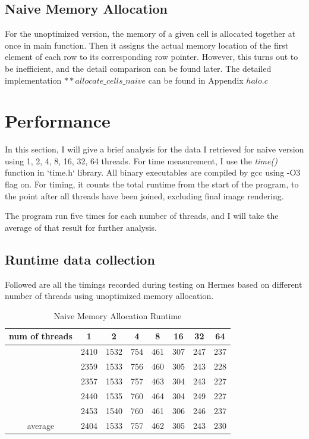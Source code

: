 \documentclass{cs4444}
\begin{document}
	\subsection{Naive Memory Allocation}
		
		For the unoptimized version, the memory of a given cell is allocated together at once in main function. Then it assigns the actual memory location of the first element of each row to its corresponding row pointer. However, this turns out to be inefficient, and the detail comparison can be found later. The detailed implementation $**allocate\_cells\_naive$ can be found in Appendix $halo.c$ 
				 
\section{Performance}
	In this section, I will give a brief analysis for the data I retrieved for naive version using 1, 2, 4, 8, 16, 32, 64 threads. For time measurement, I use the \textit{time()} function in `time.h` library. All binary executables are compiled by gcc using -O3 flag on. For timing, it counts the total runtime from the start of the program, to the point after all threads have been joined, excluding final image rendering.
	 	
	 	The program run five times for each number of threads, and I will take the average of that result for further analysis.

\subsection{Runtime data collection}
	Followed are all the timings recorded during testing on Hermes based on different number of threads using unoptimized memory allocation.
	
\begin{table}[ht]
\caption {Naive Memory Allocation Runtime}
\centering
\begin{tabular}{c c c c c c c c}
\hline\hline
num of threads & 1 & 2 & 4 & 8 & 16 & 32 & 64 \\
\hline
 & 2410 & 1532 & 754 & 461 & 307 & 247 & 237 \\
 & 2359 & 1533 & 756 & 460 & 305 & 243 & 228 \\
 & 2357 & 1533 & 757 & 463 & 304 & 243 & 227 \\
 & 2440 & 1535 & 760 & 464 & 304 & 249 & 227 \\
 & 2453 & 1540 & 760 & 461 & 306 & 246 & 237 \\
\hline
average & 2404 & 1533 & 757 & 462 & 305 & 243 & 230 \\
\end{tabular}
\centering
\end{table}
\end{document}
